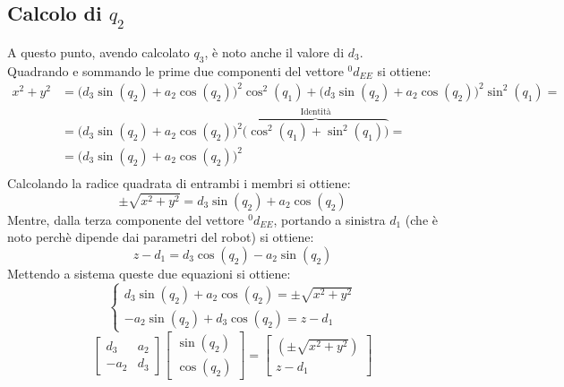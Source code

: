﻿\documentclass[11pt, a4paper]{article}
\begin{document}
\subsection*{Calcolo di $q_2$}
A questo punto, avendo calcolato $q_3$, è noto anche il valore di $d_3$.\\
Quadrando e sommando le prime due componenti del vettore ${}^{0}d_{EE}$ si ottiene:
\begin{align*}
    x^{2} + y^{2} &= \biggl(d_3 \sin(q_2) + a_2 \cos(q_2)\biggr)^{2} \cos^2(q_1) + \biggl(d_3 \sin(q_2) + a_2 \cos(q_2)\biggr)^{2} \sin^2(q_1) = \\
    &= \biggl(d_3 \sin(q_2) + a_2 \cos(q_2)\biggr)^{2} \overbrace{\biggl(\cos^2(q_1) + \sin^2(q_1)\biggr)}^{\text{Identità}} = \\
    &= \biggl(d_3 \sin(q_2) + a_2 \cos(q_2)\biggr)^{2} \\
\end{align*}
Calcolando la radice quadrata di entrambi i membri si ottiene:
\[
    \pm\sqrt{x^{2} + y^{2}} = d_3 \sin(q_2) + a_2 \cos(q_2)
\]
Mentre, dalla terza componente del vettore ${}^{0}d_{EE}$, portando a sinistra $d_1$ (che è noto perchè dipende dai parametri del robot) si ottiene:
\[
    z - d_1 = d_3 \cos(q_2) - a_2 \sin(q_2)
\]
Mettendo a sistema queste due equazioni si ottiene:
\[
    \begin{cases}
        d_{3} \sin(q_2) + a_2 \cos(q_2) = \pm\sqrt{x^{2} + y^{2}}\\
        -a_{2} \sin(q_2) + d_{3} \cos(q_2) = z - d_1
    \end{cases}
\]
\[
    \begin{bmatrix}
        d_{3} & a_{2} \\
        -a_{2} & d_{3}
    \end{bmatrix}
    \begin{bmatrix}
        \sin(q_2)\\
        \cos(q_2)
    \end{bmatrix}
    =
    \begin{bmatrix}
        (\pm \sqrt{x^2+y^2}) \\
        z - d_1
    \end{bmatrix}
\]
\end{document}
